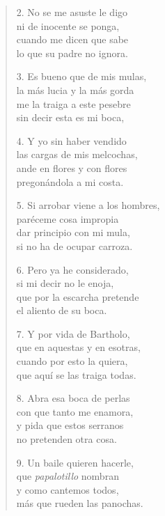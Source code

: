 \documentclass{vcscores}
\begin{document}
\begin{multicols}{2}
\begin{verse}
2. No se me asuste le digo \\
ni de inocente se ponga, \\
cuando me dicen que sabe \\
lo que su padre no ignora. 

3. Es bueno que de mis mulas, \\
la más lucia y la más gorda \\
me la traiga a este pesebre \\
sin decir esta es mi boca,

4. Y yo sin haber vendido \\
las cargas de mis melcochas, \\
ande en flores y con flores \\
pregonándola a mi costa. 

5. Si arrobar viene a los hombres, \\
paréceme cosa impropia \\
dar principio con mi mula, \\
si no ha de ocupar carroza. 

6. Pero ya he considerado, \\
si mi decir no le enoja, \\
que por la escarcha pretende \\
el aliento de su boca.  

7. Y por vida de Bartholo, \\
que en aquestas y en esotras, \\
cuando por esto la quiera, \\
que aquí se las traiga todas. 

8. Abra esa boca de perlas \\
con que tanto me enamora, \\
y pida que estos serranos \\
no pretenden otra cosa. 

9. Un baile quieren hacerle, \\
que \emph{papalotillo} nombran \\
y como cantemos todos, \\
más que rueden las panochas.
\end{verse}
\end{multicols}
\end{document}
